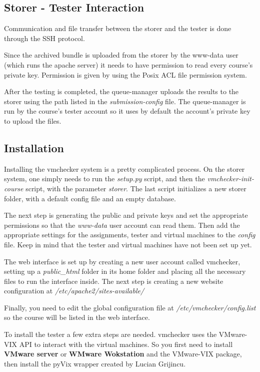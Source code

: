 \subsection{Storer - Tester Interaction}
\label{sub-sec:interaction}

Communication and file transfer between the storer and the tester is done
through the SSH protocol. 

Since the archived bundle is uploaded from the storer by the www-data user (which
runs the apache server) it needs to have permission to read every course's private key. 
Permission is given by using the Posix ACL file permission system.

After the testing is completed, the queue-manager uploads the results to the storer
using the path listed in the {\it submission-config} file. The queue-manager is run by the 
course's tester account so it uses by default the account's private key to upload
the files.

\subsection{Installation}
\label{sub-sec:install}

Installing the vmchecker system is a pretty complicated process.
On the storer system, one simply needs to run the \textit{setup.py} script, and then 
the \textit{vmchecker-init-course} script, with the parameter \textit{storer}. The last script
initializes a new storer folder, with a default config file and an empty database.

The next step is generating the public and private keys and set the appropriate 
permissions so that the \textit{www-data} user account can read them. Then add the appropriate 
settings for the assignments, tester and virtual machines to the {\it config} file.
Keep in mind that the tester and virtual machines have not been set up yet.

The web interface is set up by creating a new user account called vmchecker,
setting up a \textit{public_html} folder in its home folder and placing all the necessary files
to run the interface inside. The next step is creating a new website configuration at 
\textit{/etc/apache2/sites-available/}

Finally, you need to edit the global configuration file at \textit{/etc/vmchecker/config.list}
so the course will be listed in the web interface.

To install the tester a few extra steps are needed. vmchecker uses the VMware-VIX
API to interact with the virtual machines. So you first need to install {\bf VMware
server} or {\bf WMware Wokstation} and the VMware-VIX package, then install the pyVix 
wrapper created by Lucian Grijincu.


